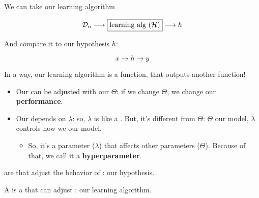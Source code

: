         We can take our learning algorithm
        
        \begin{equation*}
            {\cal D}_n \longrightarrow 
            \boxed{\text{learning alg (${\cal H}$)}} 
            \longrightarrow h
        \end{equation*}
        
        And compare it to our hypothesis $h$:
        
        $$ x \rightarrow \boxed{h} \rightarrow y $$
        
        In a way, our learning algorithm is a function, that outputs another function!

        \begin{itemize}
            \item Our  can be adjusted with our  $\Theta$: if we change $\Theta$, we change our \textbf{performance}.
            
            \item Our  depends on $\lambda$: so, $\lambda$ is like a . But, it's different from $\Theta$: $\Theta$  our model, $\lambda$ controls how we  our model.
                \begin{itemize}
                    \item So, it's a parameter ($\lambda$) that affects other parameters ($\Theta$). Because of that, we call it a \textbf{hyperparameter}.
                        \\
                \end{itemize}
        \end{itemize}
        
        
        
        
        
        
        
        \begin{definition}
             are  that adjust the behavior of : our hypothesis.
            
            A  is a  that can adjust : our learning algorithm. 
        \end{definition}
        
